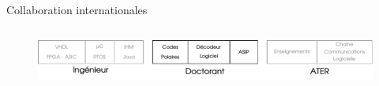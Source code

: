 \documentclass[t,compress,mathserif,12pt,xcolor=dvipsnames]{beamer}
\begin{document}
\begin{frame}[t]{Collaboration internationales}
\begin{minipage}[t][5.0cm][t]{\textwidth}
\begin{columns}[T]
\begin{column}{0.33\textwidth}
      \end{column}
    \end{columns}
  \end{minipage}
  \begin{figure}[htp]
    \centering
    \includegraphics[width=\textwidth]{fig/frise23}
  \end{figure}
\end{frame}
\end{document}
